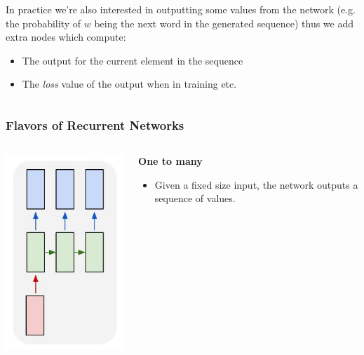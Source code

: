 \documentclass{beamer}
\begin{document}
\begin{frame}
\begin{columns}
\begin{column}{0.7\textwidth}
      In practice we're also interested in outputting some values from the network (e.g. the probability of \(w\) being the next word in the generated sequence) thus we add extra nodes which compute:
      \begin{itemize}
        \item The output for the current element in the sequence
        \item The \textit{loss} value of the output when in training etc.
      \end{itemize}
    \end{column}
  \end{columns}
\end{frame}

\begin{frame}[allowframebreaks]
  \frametitle{Flavors of Recurrent Networks \cite{rnn-efectiveness}}
  \begin{columns}
    \begin{column}{0.3\textwidth}
      \begin{center}
        \includegraphics[height=0.7\textheight]{../img/rnn-one-to-many.png}
      \end{center}
    \end{column}
    \begin{column}{0.7\textwidth}
      \begin{center}
        \textbf{One to many}
      \end{center}
      \begin{itemize}
        \item Given a fixed size input, the network outputs a sequence of values.

\end{itemize}
\end{column}
\end{columns}
\end{frame}
\end{document}

